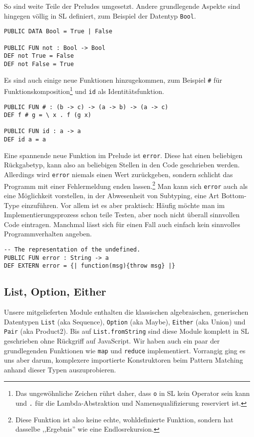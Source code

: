 \documentclass[runningheads]{llncs}
\begin{document}
So sind weite Teile der Preludes umgesetzt. Andere grundlegende Aspekte
sind hingegen völlig in SL definiert, zum Beispiel der Datentyp \verb|Bool|.

\begin{verbatim}
PUBLIC DATA Bool = True | False

PUBLIC FUN not : Bool -> Bool
DEF not True = False
DEF not False = True
\end{verbatim}

Es sind auch einige neue Funktionen hinzugekommen, zum Beispiel \verb|#|
für Funktionskomposition\footnote{Das ungewöhnliche Zeichen rührt daher,
dass \texttt{o} in SL kein Operator sein kann und \texttt{.} für die
Lambda-Abstraktion und Namensqualifizierung reserviert ist.} und
\verb|id| als Identitätsfunktion.

\begin{verbatim}
PUBLIC FUN # : (b -> c) -> (a -> b) -> (a -> c)
DEF f # g = \ x . f (g x)

PUBLIC FUN id : a -> a
DEF id a = a
\end{verbatim}

Eine spannende neue Funktion im Prelude ist \verb|error|. Diese hat einen
beliebigen Rückgabetyp, kann also an beliebigen Stellen in den Code
geschrieben werden. Allerdings wird \verb|error| niemals einen Wert
zurückgeben, sondern schlicht das Programm mit einer Fehlermeldung enden
lassen.\footnote{Diese Funktion ist also keine echte, wohldefinierte Funktion,
sondern hat dasselbe ,,Ergebnis'' wie eine Endlosrekursion.} Man kann sich
\verb|error| auch als eine Möglichkeit vorstellen, in der Abwesenheit von
Subtyping, eine Art Bottom-Type einzuführen. Vor allem ist es aber praktisch:
Häufig möchte man im Implementierungsprozess schon teile Testen, aber noch
nicht überall sinnvollen Code eintragen. Manchmal lässt sich für einen
Fall auch einfach kein sinnvolles Programmverhalten angeben.

\begin{verbatim}
-- The representation of the undefined.
PUBLIC FUN error : String -> a
DEF EXTERN error = {| function(msg){throw msg} |} 
\end{verbatim}

\subsection{List, Option, Either}

Unsere mitgelieferten Module enthalten die klassischen algebraischen,
generischen Datentypen \verb|List| (aka Sequence), \verb|Option| (aka Maybe),
\verb|Either| (aka Union) und \verb|Pair| (aka Product2).
Bis auf \verb|List.fromString| sind diese Module komplett in SL geschrieben
ohne Rückgriff auf JavaScript. Wir haben auch ein paar der grundlegenden
Funktionen wie \verb|map| und \verb|reduce| implementiert. Vorrangig ging
es uns aber darum, komplexere importierte Konstruktoren beim Pattern Matching
anhand dieser Typen auszuprobieren.
\end{document}

